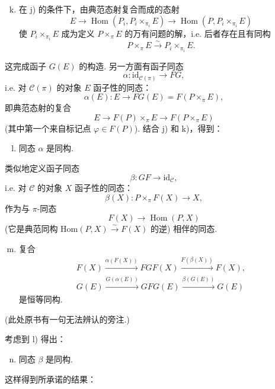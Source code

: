 \begin{enumerate}[a)]
\setcounter{enumi}{10}
\item 在 j) 的条件下，由典范态射复合而成的态射
\[
E \longrightarrow \operatorname{Hom}(P_i, P_i \times_{\pi_i} E) \longrightarrow \operatorname{Hom}(P, P_i \times_{\pi_i} E)
\]
使 $P_i \times_{\pi_i} E$ 成为定义 $P \times_\pi E$ 的万有问题的解，i.e. 后者存在且有同构
\[
P \times_\pi E \stackrel{\sim}{\longrightarrow} P_i \times_{\pi_i} E.
\]
\end{enumerate}

这完成函子 $G(E)$ 的构造. 另一方面有函子同态
\[
\alpha \colon \mathrm{id}_{\mathcal{C}(\pi)} \longrightarrow FG,
\]
i.e. 对 $\mathcal{C}(\pi)$ 的对象 $E$ 函子性的同态：
\[
\alpha(E) \colon E \longrightarrow FG(E) = F(P \times_\pi E),
\]
即典范态射的复合
\[
E \longrightarrow F(P) \times_\pi E \longrightarrow F(P \times_\pi E)
\]
(其中第一个来自标记点 $\varphi \in F(P)$). 结合 j) 和 k)，得到：

\begin{enumerate}[a)]
\setcounter{enumi}{11}
\item 同态 $\alpha$ 是同构.
\end{enumerate}

类似地定义函子同态
\[
\beta \colon GF \longrightarrow \mathrm{id}_{\mathcal{C}},
\]
i.e. 对 $\mathcal{C}$ 的对象 $X$ 函子性的同态：
\[
\beta(X) \colon P \times_\pi F(X) \longrightarrow X,
\]
作为与 $\pi$-同态
\[
F(X) \longrightarrow \operatorname{Hom}(P, X)
\]
(它是典范同构 $\mathrm{Hom}(P, X) \stackrel{\sim}{\longrightarrow} F(X)$ 的逆) 相伴的同态.

\begin{enumerate}[a)]
\setcounter{enumi}{12}
\item 复合
\[
\begin{array}{c}
F(X) \xrightarrow{\alpha(F(X))} FGF(X) \xrightarrow{F(\beta(X))} F(X), \\
G(E) \xrightarrow{G(\alpha(E))} GFG(E) \xrightarrow{\beta(G(E))} G(E)
\end{array}
\]
是恒等同构.
\end{enumerate}

(此处原书有一句无法辨认的旁注.)

考虑到 l) 得出：

\begin{enumerate}[a)]
\setcounter{enumi}{13}
\item 同态 $\beta$ 是同构.
\end{enumerate}

这样得到所承诺的结果：


